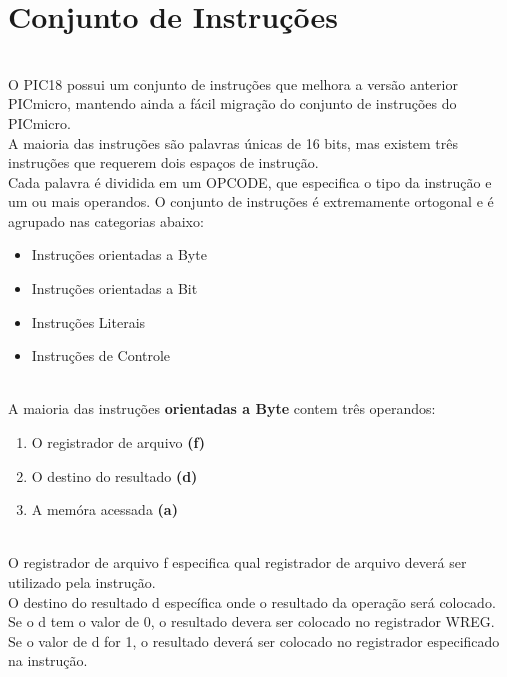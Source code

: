\documentclass[12pt]{article}
\begin{document}
\section{Conjunto de Instruções}
\\O PIC18 possui um conjunto de instruções que melhora a versão anterior PICmicro, mantendo ainda a fácil migração do conjunto de instruções do PICmicro.
\\A maioria das instruções são palavras únicas de 16 bits, mas existem três instruções que requerem dois espaços de instrução.
\\Cada palavra é dividida em um OPCODE, que especifica o tipo da instrução e um ou mais operandos. O conjunto de instruções é extremamente ortogonal e é agrupado nas categorias abaixo:
\begin{itemize}
	\item Instruções orientadas a Byte 
	\item Instruções orientadas a Bit 
	\item Instruções Literais 
	\item Instruções de Controle
\end{itemize}
\clearpage
\\A maioria das instruções \textbf{orientadas a Byte} contem três operandos:
\begin{enumerate}
	\item O registrador de arquivo \textbf{(f)}
	\item O destino do resultado \textbf{(d)}
	\item A memóra acessada \textbf{(a)}
\end{enumerate}
\\O registrador de arquivo f especifica qual registrador de arquivo deverá ser utilizado pela instrução.
\\O destino do resultado d específica onde o resultado da operação será colocado. Se o d tem o valor de 0, o resultado devera ser colocado no registrador WREG. Se o valor de d for 1, o resultado deverá ser colocado no registrador especificado na instrução.
\end{document}
